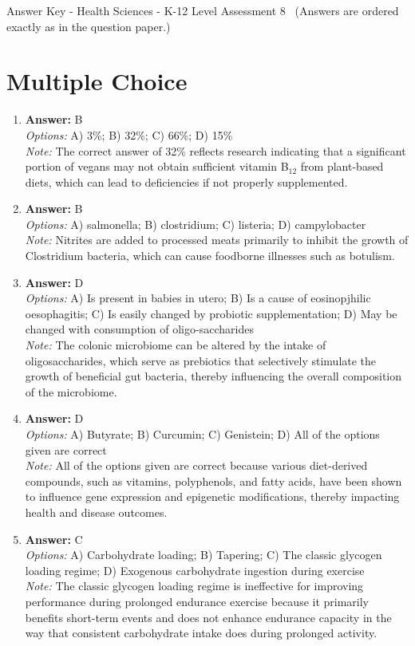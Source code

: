 \documentclass[12pt]{article}
\begin{document}
\begin{center}
Answer Key - Health Sciences - K-12 Level Assessment 8 \
\small (Answers are ordered exactly as in the question paper.)
\end{center}

\section*{Multiple Choice}
\begin{enumerate}[label=\arabic*.]
\item \textbf{Answer:} B
\\ \textit{Options:} A) 3\%; B) 32\%; C) 66\%; D) 15\%
\\ \textit{Note:} The correct answer of 32\% reflects research indicating that a significant portion of vegans may not obtain sufficient vitamin B$_{12}$ from plant-based diets, which can lead to deficiencies if not properly supplemented.
\item \textbf{Answer:} B
\\ \textit{Options:} A) salmonella; B) clostridium; C) listeria; D) campylobacter
\\ \textit{Note:} Nitrites are added to processed meats primarily to inhibit the growth of Clostridium bacteria, which can cause foodborne illnesses such as botulism.
\item \textbf{Answer:} D
\\ \textit{Options:} A) Is present in babies in utero; B) Is a cause of eosinopjhilic oesophagitis; C) Is easily changed by probiotic supplementation; D) May be changed with consumption of oligo-saccharides
\\ \textit{Note:} The colonic microbiome can be altered by the intake of oligosaccharides, which serve as prebiotics that selectively stimulate the growth of beneficial gut bacteria, thereby influencing the overall composition of the microbiome.
\item \textbf{Answer:} D
\\ \textit{Options:} A) Butyrate; B) Curcumin; C) Genistein; D) All of the options given are correct
\\ \textit{Note:} All of the options given are correct because various diet-derived compounds, such as vitamins, polyphenols, and fatty acids, have been shown to influence gene expression and epigenetic modifications, thereby impacting health and disease outcomes.
\item \textbf{Answer:} C
\\ \textit{Options:} A) Carbohydrate loading; B) Tapering; C) The classic glycogen loading regime; D) Exogenous carbohydrate ingestion during exercise
\\ \textit{Note:} The classic glycogen loading regime is ineffective for improving performance during prolonged endurance exercise because it primarily benefits short-term events and does not enhance endurance capacity in the way that consistent carbohydrate intake does during prolonged activity.
\end{enumerate}
\end{document}
